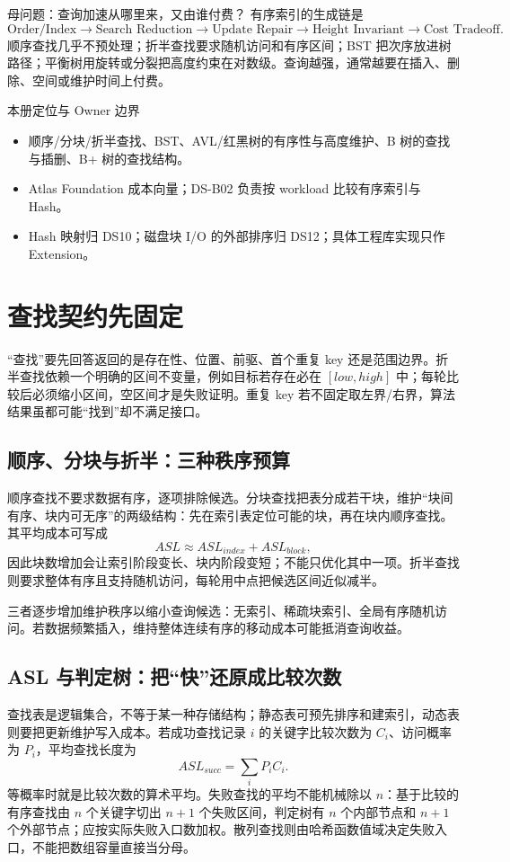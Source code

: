 \documentclass[UTF8,fontset=none,11pt,a4paper]{ctexart}
\begin{document}

\begin{corebox}{母问题：查询加速从哪里来，又由谁付费？}
有序索引的生成链是
\[
\text{Order/Index}\to\text{Search Reduction}\to\text{Update Repair}\to\text{Height Invariant}\to\text{Cost Tradeoff}.
\]
顺序查找几乎不预处理；折半查找要求随机访问和有序区间；BST 把次序放进树路径；平衡树用旋转或分裂把高度约束在对数级。查询越强，通常越要在插入、删除、空间或维护时间上付费。
\end{corebox}
\begin{methodbox}{本册定位与 Owner 边界}
\begin{itemize}
\item {}顺序/分块/折半查找、BST、AVL/红黑树的有序性与高度维护、B 树的查找与插删、B+ 树的查找结构。
\item {}Atlas Foundation 成本向量；DS-B02 负责按 workload 比较有序索引与 Hash。
\item {}Hash 映射归 DS10；磁盘块 I/O 的外部排序归 DS12；具体工程库实现只作 Extension。
\end{itemize}
\end{methodbox}
\tableofcontents\newpage

\section{查找契约先固定}
“查找”要先回答返回的是存在性、位置、前驱、首个重复 key 还是范围边界。折半查找依赖一个明确的区间不变量，例如目标若存在必在 $[low,high]$ 中；每轮比较后必须缩小区间，空区间才是失败证明。重复 key 若不固定取左界/右界，算法结果虽都可能“找到”却不满足接口。

\subsection{顺序、分块与折半：三种秩序预算}
顺序查找不要求数据有序，逐项排除候选。分块查找把表分成若干块，维护“块间有序、块内可无序”的两级结构：先在索引表定位可能的块，再在块内顺序查找。其平均成本可写成
\[
ASL\approx ASL_{index}+ASL_{block},
\]
因此块数增加会让索引阶段变长、块内阶段变短；不能只优化其中一项。折半查找则要求整体有序且支持随机访问，每轮用中点把候选区间近似减半。

三者逐步增加维护秩序以缩小查询候选：无索引、稀疏块索引、全局有序随机访问。若数据频繁插入，维持整体连续有序的移动成本可能抵消查询收益。

\subsection{ASL 与判定树：把“快”还原成比较次数}
查找表是逻辑集合，不等于某一种存储结构；静态表可预先排序和建索引，动态表则要把更新维护写入成本。若成功查找记录 $i$ 的关键字比较次数为 $C_i$、访问概率为 $P_i$，平均查找长度为
\[
ASL_{succ}=\sum_i P_iC_i.
\]
等概率时就是比较次数的算术平均。失败查找的平均不能机械除以 $n$：基于比较的有序查找由 $n$ 个关键字切出 $n+1$ 个失败区间，判定树有 $n$ 个内部节点和 $n+1$ 个外部节点；应按实际失败入口数加权。散列查找则由哈希函数值域决定失败入口，不能把数组容量直接当分母。
\end{document}
